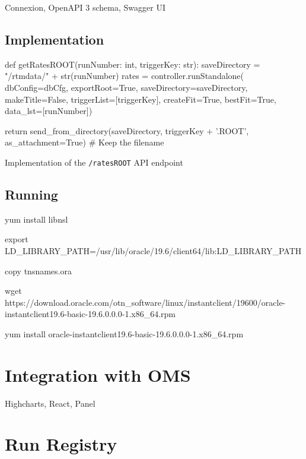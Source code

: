 Connexion, OpenAPI 3 schema, Swagger UI

\subsection{Implementation}

\begin{listing}[ht]
\begin{pythoncode}
def getRatesROOT(runNumber: int, triggerKey: str):
    saveDirectory = "/rtmdata/" + str(runNumber)
    rates = controller.runStandalone(
                         dbConfig=dbCfg,
                         exportRoot=True,
                         saveDirectory=saveDirectory,
                         makeTitle=False,
                         triggerList=[triggerKey],
                         createFit=True,
                         bestFit=True,
                         data_lst=[runNumber])

    return send_from_directory(saveDirectory,
                               triggerKey + '.ROOT',
                               as_attachment=True) # Keep the filename
\end{pythoncode}
\caption{Implementation of the \texttt{/ratesROOT} API endpoint}
\end{listing}

\subsection{Running}
\begin{textcode}
yum install libnsl

export LD_LIBRARY_PATH=/usr/lib/oracle/19.6/client64/lib:LD_LIBRARY_PATH

copy tnsnames.ora

wget https://download.oracle.com/otn_software/linux/instantclient/19600/oracle-instantclient19.6-basic-19.6.0.0.0-1.x86_64.rpm

yum install oracle-instantclient19.6-basic-19.6.0.0.0-1.x86_64.rpm
\end{textcode}

\section{Integration with OMS}

Highcharts, React, Panel

\section{Run Registry}

